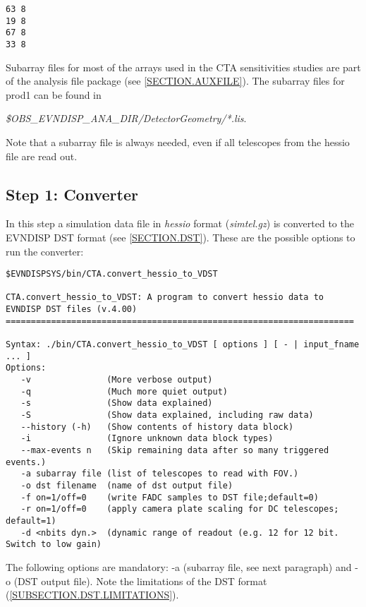 \documentclass[titlepage,a4paper,twoside,11pt]{report}
\begin{document}
\begin{lstlisting}
63 8
19 8
67 8
33 8
\end{lstlisting}

Subarray files for most of the arrays used in the CTA sensitivities studies are part of the analysis file package 
(see \ref{SECTION.AUXFILE}). The subarray files for prod1 can be found in 

{\it \$OBS\_EVNDISP\_ANA\_DIR/DetectorGeometry/*.lis}.

Note that a subarray file is always needed, even if all telescopes from the hessio file are read out.

\subsection{Step 1: Converter}

In this step a simulation data file in {\it hessio} format ({\it simtel.gz}) is converted to the EVNDISP DST format 
(see \ref{SECTION.DST}). These are the possible options to run the converter:

\begin{small}
\begin{lstlisting}
$EVNDISPSYS/bin/CTA.convert_hessio_to_VDST

CTA.convert_hessio_to_VDST: A program to convert hessio data to EVNDISP DST files (v.4.00)
=====================================================================

Syntax: ./bin/CTA.convert_hessio_to_VDST [ options ] [ - | input_fname ... ]
Options:
   -v               (More verbose output)
   -q               (Much more quiet output)
   -s               (Show data explained)
   -S               (Show data explained, including raw data)
   --history (-h)   (Show contents of history data block)
   -i               (Ignore unknown data block types)
   --max-events n   (Skip remaining data after so many triggered events.)
   -a subarray file (list of telescopes to read with FOV.)
   -o dst filename  (name of dst output file)
   -f on=1/off=0    (write FADC samples to DST file;default=0)
   -r on=1/off=0    (apply camera plate scaling for DC telescopes; default=1)
   -d <nbits dyn.>  (dynamic range of readout (e.g. 12 for 12 bit. Switch to low gain)
\end{lstlisting}
\end{small}


The following options are mandatory: -a (subarray  file, see next paragraph) and -o (DST output file).
Note the limitations of the DST format (\ref{SUBSECTION.DST.LIMITATIONS}).
\end{document}
